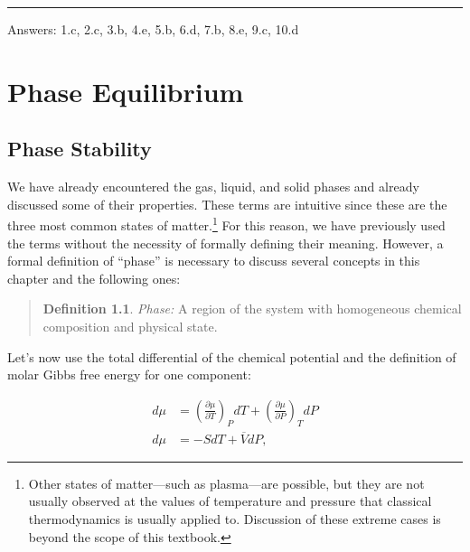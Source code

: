\documentclass[
  9pt,
]{extbook}
\theoremstyle{definition}
\newtheorem{definition}{Definition}[chapter]
\theoremstyle{definition}
\theoremstyle{definition}
\theoremstyle{definition}
\theoremstyle{remark}
\begin{document}
\begin{center}\rule{0.5\linewidth}{0.5pt}\end{center}

Answers: 1.c, 2.c, 3.b, 4.e, 5.b, 6.d, 7.b, 8.e, 9.c, 10.d

\renewcommand*{\standardstate}{{-\kern-6pt{\ominus}\kern-6pt-}}

\chapter{Phase Equilibrium}\label{PhaseEquilibrium}

\section{Phase Stability}\label{phase-stability}

We have already encountered the gas, liquid, and solid phases and already discussed some of their properties. These terms are intuitive since these are the three most common states of matter.\footnote{Other states of matter---such as plasma---are possible, but they are not usually observed at the values of temperature and pressure that classical thermodynamics is usually applied to. Discussion of these extreme cases is beyond the scope of this textbook.} For this reason, we have previously used the terms without the necessity of formally defining their meaning. However, a formal definition of ``phase'' is necessary to discuss several concepts in this chapter and the following ones:

\begin{quote}
\begin{definition}
\protect\hypertarget{def:phasedef}{}\label{def:phasedef}\emph{Phase:} A region of the system with homogeneous chemical composition and physical state.
\end{definition}
\end{quote}

Let's now use the total differential of the chemical potential and the definition of molar Gibbs free energy for one component:

\begin{equation}
\begin{aligned}
d\mu &= \left( \frac{\partial \mu}{\partial T} \right)_P dT + \left( \frac{\partial \mu}{\partial P} \right)_T dP \\
d\mu &= -SdT+\overline{V}dP,
\end{aligned}
\label{eq:muequal1}
\end{equation}
\end{document}
